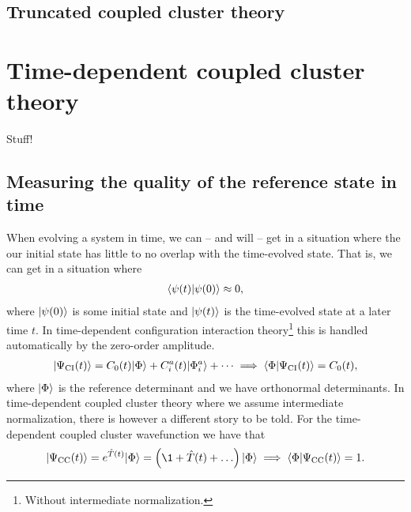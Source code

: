         \subsection{Truncated coupled cluster theory}

    \section{Time-dependent coupled cluster theory}
        Stuff!


        \subsection{Measuring the quality of the reference state in time}
            When evolving a system in time, we can -- and will -- get in a
            situation where the our initial state has little to no overlap with
            the time-evolved state.
            That is, we can get in a situation where
            \begin{align}
                \langle \psi(t) | \psi(0) \rangle \approx 0,
            \end{align}
            where $| \psi(0) \rangle$ is some initial state and $| \psi(t) \rangle$ is
            the time-evolved state at a later time $t$.
            In time-dependent configuration interaction theory\footnote{
                Without intermediate normalization.
            } this is handled automatically by the
            zero-order amplitude.
            \begin{gather}
                | \Psi_{\text{CI}}(t) \rangle = C_0(t)| \Phi \rangle + C^{a}_{i}(t)| \Phi^{a}_{i} \rangle + \dots
                \implies \langle \Phi | \Psi_{\text{CI}}(t) \rangle = C_0(t),
            \end{gather}
            where $| \Phi \rangle$ is the reference determinant and we have
            orthonormal determinants.
            In time-dependent coupled cluster theory where we assume
            intermediate normalization, there is however a different story to be
            told.
            For the time-dependent coupled cluster wavefunction we have that
            \begin{gather}
                \ket{\cc(t)} = e^{\clust(t)}\ketslat
                = \para{
                    \1
                    + \clust(t)
                    + \dots
                }\ketslat
                \implies
                \braket{\slat}{\cc(t)} = 1.
            \end{gather}
